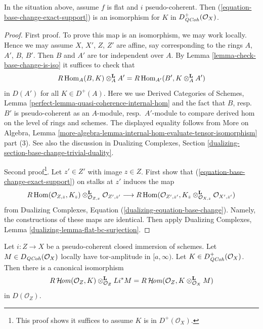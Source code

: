 \begin{lemma}
\label{lemma-flat-bc-sheaf-with-exact-support}
In the situation above, assume $f$ is flat and $i$ pseudo-coherent.
Then (\ref{equation-base-change-exact-support}) is an isomorphism
for $K$ in $D^+_{\mathit{QCoh}}(\mathcal{O}_X)$.
\end{lemma}

\begin{proof}
First proof. To prove this map is an isomorphism, we may work locally.
Hence we may assume $X$, $X'$, $Z$, $Z'$ are affine, say corresponding
to the rings $A$, $A'$, $B$, $B'$. Then $B$ and $A'$ are tor independent
over $A$. By Lemma \ref{lemma-check-base-change-is-iso} it suffices
to check that
$$
R\mathop{\mathrm{Hom}}\nolimits_A(B, K) \otimes_A^\mathbf{L} A' =
R\mathop{\mathrm{Hom}}\nolimits_{A'}(B', K \otimes_A^\mathbf{L} A')
$$
in $D(A')$ for all $K \in D^+(A)$. Here we use
Derived Categories of Schemes, Lemma
\ref{perfect-lemma-quasi-coherence-internal-hom}
and the fact that $B$, resp.\ $B'$ is pseudo-coherent as an
$A$-module, resp.\ $A'$-module
to compare derived hom on the level of rings and schemes.
The displayed equality follows from
More on Algebra, Lemma
\ref{more-algebra-lemma-internal-hom-evaluate-tensor-isomorphism}
part (3). See also the discussion in Dualizing Complexes, Section
\ref{dualizing-section-base-change-trivial-duality}.

\medskip\noindent
Second proof\footnote{This proof shows
it suffices to assume $K$ is in $D^+(\mathcal{O}_X)$.}.
Let $z' \in Z'$ with image $z \in Z$.
First show that (\ref{equation-base-change-exact-support})
on stalks at $z'$ induces the map
$$
R\mathop{\mathrm{Hom}}\nolimits(\mathcal{O}_{Z, z}, K_z)
\otimes_{\mathcal{O}_{Z, x}}^\mathbf{L} \mathcal{O}_{Z', z'}
\longrightarrow
R\mathop{\mathrm{Hom}}\nolimits(\mathcal{O}_{Z', z'},
K_z \otimes_{\mathcal{O}_{X, z}}^\mathbf{L} \mathcal{O}_{X', z'})
$$
from Dualizing Complexes, Equation (\ref{dualizing-equation-base-change}).
Namely, the constructions of these maps are identical.
Then apply Dualizing Complexes, Lemma \ref{dualizing-lemma-flat-bc-surjection}.
\end{proof}

\begin{lemma}
\label{lemma-sheaf-with-exact-support-tensor}
Let $i : Z \to X$ be a pseudo-coherent closed immersion of schemes.
Let $M \in D_{\mathit{QCoh}}(\mathcal{O}_X)$ locally have tor-amplitude in $[a, \infty)$.
Let $K \in D_{\mathit{QCoh}}^+(\mathcal{O}_X)$. Then there is a canonical isomorphism
$$
R\mathop{\mathcal{H}\!\mathit{om}}\nolimits(\mathcal{O}_Z, K) \otimes_{\mathcal{O}_Z}^\mathbf{L} Li^*M =
R\mathop{\mathcal{H}\!\mathit{om}}\nolimits(\mathcal{O}_Z, K \otimes_{\mathcal{O}_X}^\mathbf{L} M)
$$
in $D(\mathcal{O}_Z)$.
\end{lemma}

